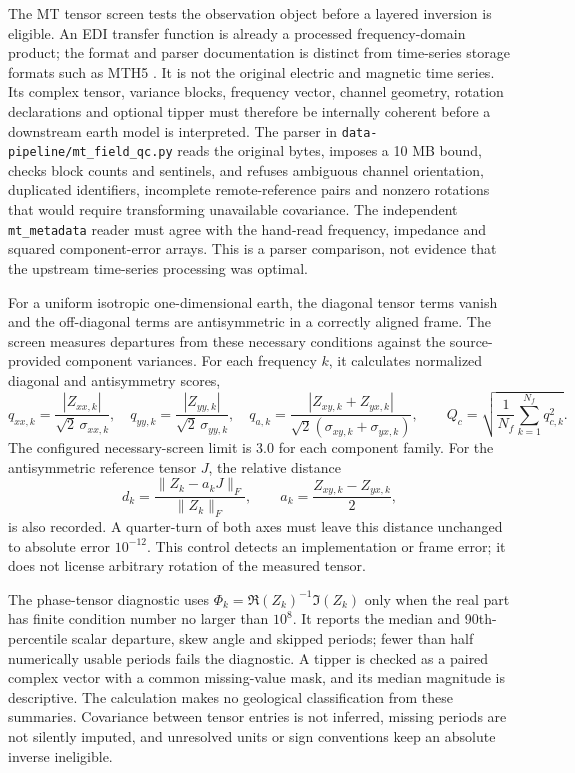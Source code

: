 The MT tensor screen tests the observation object before a layered inversion is eligible. An
EDI transfer function is already a processed frequency-domain product;
the format and parser documentation is distinct from time-series storage
formats such as MTH5 \cite{mtpy,peacock2022}. It is not the original
electric and magnetic time series. Its complex tensor,
variance blocks, frequency vector, channel geometry, rotation declarations
and optional tipper must therefore be internally coherent before a
downstream earth model is interpreted. The parser in
\texttt{data-pipeline/mt\_field\_qc.py} reads the original bytes, imposes a
10 MB bound, checks block counts and sentinels, and refuses ambiguous
channel orientation, duplicated identifiers, incomplete remote-reference
pairs and nonzero rotations that would require transforming unavailable
covariance. The independent \texttt{mt\_metadata} reader must agree with
the hand-read frequency, impedance and squared component-error arrays.
This is a parser comparison, not evidence that the upstream time-series
processing was optimal.

For a uniform isotropic one-dimensional earth, the diagonal tensor terms
vanish and the off-diagonal terms are antisymmetric in a correctly aligned
frame. The screen measures departures from these necessary conditions
against the source-provided component variances. For each frequency
\(k\), it calculates normalized diagonal and antisymmetry scores,
\begin{equation}\label{eq:mt-qc-wrms}
 q_{xx,k}=\frac{|Z_{xx,k}|}{\sqrt{2}\,\sigma_{xx,k}},\quad
 q_{yy,k}=\frac{|Z_{yy,k}|}{\sqrt{2}\,\sigma_{yy,k}},\quad
 q_{a,k}=\frac{|Z_{xy,k}+Z_{yx,k}|}
 {\sqrt{2}(\sigma_{xy,k}+\sigma_{yx,k})},\qquad
 Q_c=\sqrt{\frac{1}{N_f}\sum_{k=1}^{N_f}q_{c,k}^2}.
\end{equation}
The configured necessary-screen limit is 3.0 for each component family.
For the antisymmetric reference tensor \(J\), the relative distance
\begin{equation}\label{eq:mt-qc-distance}
 d_k=\frac{\|Z_k-a_kJ\|_F}{\|Z_k\|_F},\qquad
 a_k=\frac{Z_{xy,k}-Z_{yx,k}}{2},
\end{equation}
is also recorded. A quarter-turn of both axes must leave this distance
unchanged to absolute error \(10^{-12}\). This control detects an
implementation or frame error; it does not license arbitrary rotation
of the measured tensor.

The phase-tensor diagnostic uses
\(\Phi_k=\Re(Z_k)^{-1}\Im(Z_k)\) only when the real part has finite
condition number no larger than \(10^8\). It reports the median and
90th-percentile scalar departure, skew angle and skipped periods; fewer
than half numerically usable periods fails the diagnostic. A tipper is
checked as a paired complex vector with a common missing-value mask, and
its median magnitude is descriptive. The calculation makes no geological
classification from these summaries. Covariance between tensor entries
is not inferred, missing periods are not silently imputed, and unresolved
units or sign conventions keep an absolute inverse ineligible.

